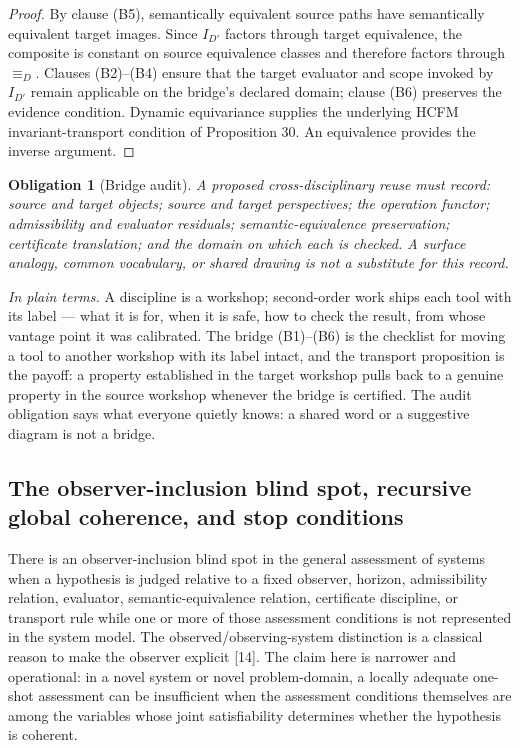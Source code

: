 \documentclass[11pt]{article}
\newtheorem{obligation}{Obligation}
\theoremstyle{definition}
\newcommand{\plainterms}{\emph{In plain terms.}}
\begin{document}
\begin{proof}
By clause (B5), semantically equivalent source paths have semantically equivalent target images. Since $I_{D'}$ factors through target equivalence, the composite is constant on source equivalence classes and therefore factors through $\equiv_D$. Clauses (B2)--(B4) ensure that the target evaluator and scope invoked by $I_{D'}$ remain applicable on the bridge's declared domain; clause (B6) preserves the evidence condition. Dynamic equivariance supplies the underlying HCFM invariant-transport condition of Proposition 30. An equivalence provides the inverse argument.
\end{proof}

\begin{obligation}[Bridge audit]
A proposed cross-disciplinary reuse must record: source and target objects; source and target perspectives; the operation functor; admissibility and evaluator residuals; semantic-equivalence preservation; certificate translation; and the domain on which each is checked. A surface analogy, common vocabulary, or shared drawing is not a substitute for this record.
\end{obligation}

\noindent\plainterms{} A discipline is a workshop; second-order work ships each tool with its label --- what it is for, when it is safe, how to check the result, from whose vantage point it was calibrated. The bridge (B1)--(B6) is the checklist for moving a tool to another workshop with its label intact, and the transport proposition is the payoff: a property established in the target workshop pulls back to a genuine property in the source workshop whenever the bridge is certified. The audit obligation says what everyone quietly knows: a shared word or a suggestive diagram is not a bridge.

\subsection{The observer-inclusion blind spot, recursive global coherence, and stop conditions}

There is an observer-inclusion blind spot in the general assessment of systems when a hypothesis is judged relative to a fixed observer, horizon, admissibility relation, evaluator, semantic-equivalence relation, certificate discipline, or transport rule while one or more of those assessment conditions is not represented in the system model. The observed/observing-system distinction is a classical reason to make the observer explicit [14]. The claim here is narrower and operational: in a novel system or novel problem-domain, a locally adequate one-shot assessment can be insufficient when the assessment conditions themselves are among the variables whose joint satisfiability determines whether the hypothesis is coherent.
\end{document}
